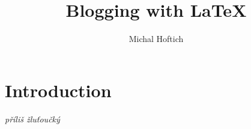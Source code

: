 \documentclass[../index2018.tex]{subfiles}
\title{Blogging with \LaTeX}
\author{Michal Hoftich}
\begin{document}
\maketitle

\tableofcontents

\section{Introduction}

\textit{příliš žluťoučký}

\printbibliography
\end{document}
